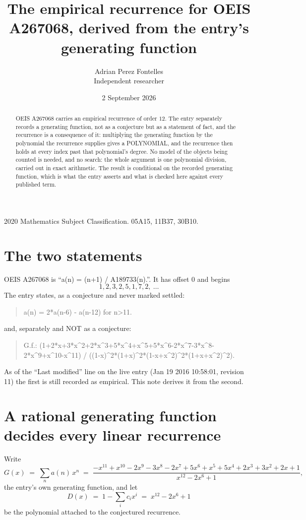 \documentclass[11pt,a4paper]{article}
\title{The empirical recurrence for OEIS A267068, derived from the entry's generating function}
\author{Adrian Perez Fontelles\\ \small Independent researcher}
\date{2 September 2026}
\theoremstyle{plain}
\theoremstyle{definition}
\begin{document}
\maketitle

\begin{abstract}
OEIS A267068 carries an empirical recurrence of order $12$. The entry separately records a
generating function, not as a conjecture but as a statement of fact, and the recurrence is a
consequence of it: multiplying the generating function by the polynomial the recurrence
supplies gives a POLYNOMIAL, and the recurrence then holds at every index past that
polynomial's degree. No model of the objects being counted is needed, and no search: the
whole argument is one polynomial division, carried out in exact arithmetic. The result is
conditional on the recorded generating function, which is what the entry asserts and what is
checked here against every published term.
\end{abstract}

\noindent\small 2020 Mathematics Subject Classification. 05A15, 11B37, 30B10.\normalsize

\section{The two statements}

OEIS A267068 is ``a(n) = (n+1) / A189733(n).''. It has offset $0$ and begins
\[
1, 2, 3, 2, 5, 1, 7, 2,\ \dots
\]
The entry states, as a conjecture and never marked settled:
\begin{quote}
a(n) = 2*a(n-6) - a(n-12) for n>11.
\end{quote}
and, separately and NOT as a conjecture:
\begin{quote}
G.f.: (1+2*x+3*x\^{}2+2*x\^{}3+5*x\^{}4+x\^{}5+5*x\^{}6-2*x\^{}7-3*x\^{}8-2*x\^{}9+x\^{}10-x\^{}11) / ((1-x)\^{}2*(1+x)\^{}2*(1-x+x\^{}2)\^{}2*(1+x+x\^{}2)\^{}2).
\end{quote}
As of the ``Last modified'' line on the live entry (Jan 19 2016 10:58:01, revision 11) the first is still
recorded as empirical. This note derives it from the second.

\section{A rational generating function decides every linear recurrence}

Write
\[
G(x)\;=\;\sum_{n}a(n)\,x^{n}\;=\;\frac{- x^{11} + x^{10} - 2 x^{9} - 3 x^{8} - 2 x^{7} + 5 x^{6} + x^{5} + 5 x^{4} + 2 x^{3} + 3 x^{2} + 2 x + 1}{x^{12} - 2 x^{6} + 1},
\]
the entry's own generating function, and let
\[
D(x)\;=\;1-\sum_i c_i x^{i}\;=\;x^{12} - 2 x^{6} + 1
\]
be the polynomial attached to the conjectured recurrence.
\end{document}
